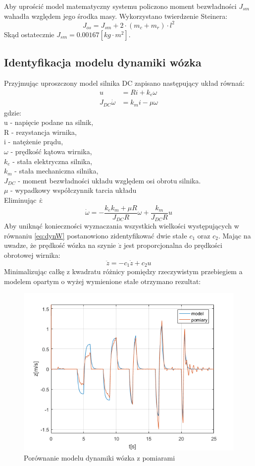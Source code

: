 Aby uprościć model matematyczny systemu policzono moment bezwładności $J_{sm}$ wahadła względem jego środka masy. Wykorzystano twierdzenie Steinera:
\begin{equation}
J_{os} = J_{sm} + 2\cdot(m_c+m_r)\cdot l^2
\end{equation}
Skąd ostatecznie $J_{sm} = 0.00167[kg \cdot m^2]$.
\subsection{Identyfikacja modelu dynamiki wózka}
Przyjmując uproszczony model silnika DC zapisano następujący układ równań:
\begin{align}
u &= Ri + k_e\omega \\
J_{DC}\dot{\omega} &= k_mi - \mu\omega
\end{align}
gdzie:\\
u - napięcie podane na silnik,\\
R - rezystancja wirnika,\\
i - natężenie prądu,\\
$\omega$ - prędkość kątowa wirnika,\\
$k_e$ - stała elektryczna silnika,\\
$k_m$ - stała mechaniczna silnika,\\
$J_{DC}$ - moment bezwładności układu względem osi obrotu silnika.\\
$\mu$ - wypadkowy współczynnik tarcia układu\\
Eliminując \textit{i}:
\begin{equation}
\label{eq:dynW}
\dot{\omega}=-\frac{k_ek_m+\mu R}{J_{DC}R}\omega+\frac{k_m}{J_{DC}R}u
\end{equation}
Aby uniknąć konieczności wyznaczania wszystkich wielkości występujących w równaniu \ref{eq:dynW} postanowiono zidentyfikować dwie stałe $c_1$ oraz $c_2$. Mając na uwadze, że prędkość wózka na szynie $\dot{z}$ jest proporcjonalna do prędkości obrotowej wirnika:
\begin{equation}
\label{eq:zz}
\ddot{z}=-c_1\dot{z}+c_2u
\end{equation}
Minimalizując całkę z kwadratu różnicy pomiędzy rzeczywistym przebiegiem a modelem opartym o wyżej wymienione stałe otrzymano rezultat:
\begin{figure}[H]
\centering
\includegraphics[width=12cm]{obrazy/pr_woz.png}
\caption{Porównanie modelu dynamiki wózka z pomiarami}
\label{fig:wozek}
\end{figure}
